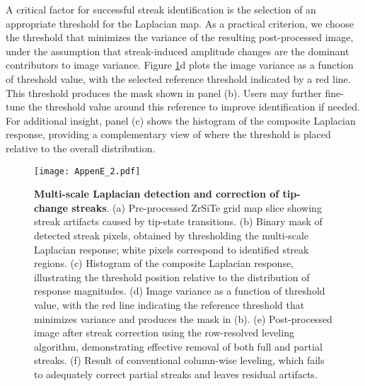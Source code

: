 A critical factor for successful streak identification is the selection of an appropriate threshold for the Laplacian map. As a practical criterion, we choose the threshold that minimizes the variance of the resulting post-processed image, under the assumption that streak-induced amplitude changes are the dominant contributors to image variance. Figure \ref{fig:streak_2}d plots the image variance as a function of threshold value, with the selected reference threshold indicated by a red line. This threshold produces the mask shown in panel (b). Users may further fine-tune the threshold value around this reference to improve identification if needed. For additional insight, panel (c) shows the histogram of the composite Laplacian response, providing a complementary view of where the threshold is placed relative to the overall distribution.  

\begin{figure}
	\texttt{[image: AppenE\_2.pdf]}
	\centering
	\caption[\textbf{Multi-scale Laplacian detection and correction of tip-change streaks}]{\textbf{Multi-scale Laplacian detection and correction of tip-change streaks}. 
		(a) Pre-processed ZrSiTe grid map slice showing streak artifacts caused by tip-state transitions. 
		(b) Binary mask of detected streak pixels, obtained by thresholding the multi-scale Laplacian response; white pixels correspond to identified streak regions. 
		(c) Histogram of the composite Laplacian response, illustrating the threshold position relative to the distribution of response magnitudes. 
		(d) Image variance as a function of threshold value, with the red line indicating the reference threshold that minimizes variance and produces the mask in (b). 
		(e) Post-processed image after streak correction using the row-resolved leveling algorithm, demonstrating effective removal of both full and partial streaks. 
		(f) Result of conventional column-wise leveling, which fails to adequately correct partial streaks and leaves residual artifacts.}
	\label{fig:streak_2}
\end{figure}  